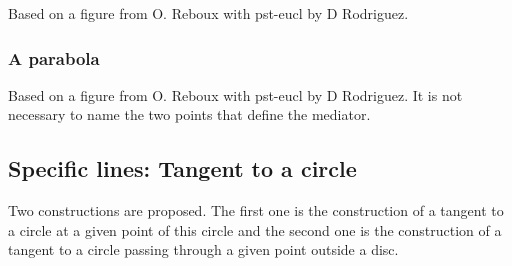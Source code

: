 Based on a figure from O. Reboux with pst-eucl by D Rodriguez.

\begin{tkzexample}[latex=6cm,small]
\end{tkzexample}

\newpage

\subsubsection{A parabola}

Based on a figure from O. Reboux with pst-eucl by D Rodriguez.
It is not necessary to name the two points that define the mediator.

\begin{tkzexample}[latex=6cm,small]
\end{tkzexample}

\subsection{Specific lines: Tangent to a circle}

Two constructions are proposed. The first one is the construction of a tangent
to a circle at a given point of this circle and the second one is the
construction of a tangent to a circle passing through a given point outside a
disc.

